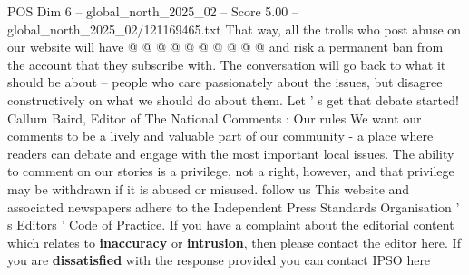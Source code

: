 \begin{textsample}{POS Dim 6 – global\_north\_2025\_02 – Score 5.00 – global\_north\_2025\_02/121169465.txt}
That way, all the trolls who post abuse on our website will have @ @ @ @ @ @ @ @ @ @ and risk a permanent ban from the account that they subscribe with.
The conversation will go back to what it should be about -- people who care passionately about the issues, but disagree constructively on what we should do about them.
Let ' s get that debate started!
Callum Baird, Editor of The National Comments : Our rules We want our comments to be a lively and valuable part of our community - a place where readers can debate and engage with the most important local issues.
The ability to comment on our stories is a privilege, not a right, however, and that privilege may be withdrawn if it is abused or misused. follow us This website and associated newspapers adhere to the Independent Press Standards Organisation ' s Editors ' Code of Practice.
If you have a complaint about the editorial content which relates to \textbf{inaccuracy} or \textbf{intrusion}, then please contact the editor here.
If you are \textbf{dissatisfied} with the response provided you can contact IPSO here

\end{textsample}

